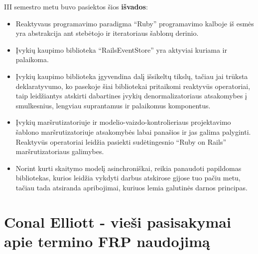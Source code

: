 \documentclass{VUMIFPSmagistrinis}
\begin{document}
III semestro metu buvo pasiektos šios \textbf{išvados}:

\begin{itemize}
  \item Reaktyvaus programavimo paradigma ``Ruby'' programavimo kalboje iš esmės yra abstrakcija ant stebėtojo ir iteratoriaus šablonų derinio.
  \item Įvykių kaupimo biblioteka ``RailsEventStore'' yra aktyviai kuriama ir palaikoma.
  \item Įvykių kaupimo biblioteka įgyvendina dalį išsikeltų tikslų, tačiau jai trūksta deklaratyvumo, ko pasekoje šiai bibliotekai pritaikomi reaktyvūs operatoriai, taip leidžiantys atskirti dabartines įvykių denormalizatoriaus atsakomybes į smulkesnius, lengviau suprantamus ir palaikomus komponentus.
  \item Įvykių maršrutizatoriuje ir modelio-vaizdo-kontrolieriaus projektavimo šablono maršrutizatoriuje atsakomybės labai panašios ir jas galima palyginti. Reaktyvūs operatoriai leidžia pasiekti sudėtingesnio ``Ruby on Rails'' maršrutizatoriaus galimybes.
  \item Norint kurti skaitymo modelį asinchroniškai, reikia panaudoti papildomas bibliotekas, kurios leidžia vykdyti darbus atskirose gijose tuo pačiu metu, tačiau tada atsiranda apribojimai, kuriuos lemia galutinės darnos principas.
\end{itemize}

\printbibliography[heading=bibintoc]  %





\appendix  %

\section{Conal Elliott - vieši pasisakymai apie termino FRP naudojimą}
\end{document}
